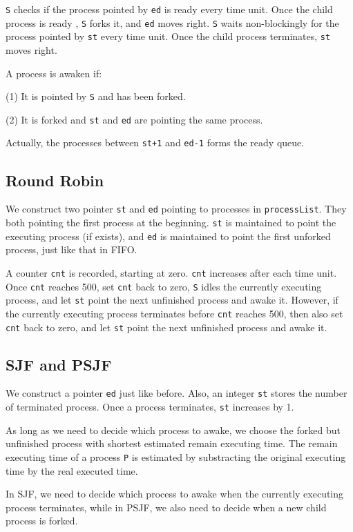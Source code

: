 \documentclass{article}
\begin{document}
        {\tt S} checks if the process pointed by {\tt ed} is ready every time unit. Once the child process is ready , {\tt S} forks it, and {\tt ed} moves right. {\tt S} waits non-blockingly for the process pointed by {\tt st} every time unit. Once the child process terminates, {\tt st} moves right.

        A process is awaken if: 

        (1) It is pointed by {\tt S} and has been forked.

        (2) It is forked and {\tt st} and {\tt ed} are pointing the same process.

        Actually, the processes between {\tt st+1} and {\tt ed-1} forms the ready queue.

    \subsection{Round Robin}
        We construct two pointer {\tt st} and {\tt ed} pointing to processes in {\tt processList}. They both pointing the first process at the beginning. {\tt st} is maintained to point the executing process (if exists), and {\tt ed} is maintained to point the first unforked process, just like that in FIFO.

        A counter {\tt cnt} is recorded, starting at zero. {\tt cnt} increases after each time unit. Once {\tt cnt} reaches 500, set {\tt cnt} back to zero, {\tt S} idles the currently executing process, and let {\tt st} point the next unfinished process and awake it. However, if the currently executing process terminates before {\tt cnt} reaches 500, then also set {\tt cnt} back to zero, and let {\tt st} point the next unfinished process and awake it.

    \subsection{SJF and PSJF}
        We construct a pointer {\tt ed} just like before. Also, an integer {\tt st} stores the number of terminated process. Once a process terminates, {\tt st} increases by 1.

        As long as we need to decide which process to awake, we choose the forked but unfinished process with shortest estimated remain executing time. The remain executing time of a process {\tt P} is estimated by substracting the original executing time by the real executed time.
        
        In SJF, we need to decide which process to awake when the currently executing process terminates, while in PSJF, we also need to decide when a new child process is forked.
\end{document}

